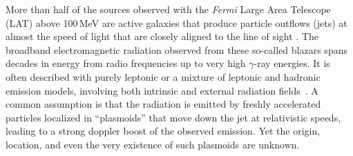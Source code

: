 \documentclass[twocolumn]{aastex62}
\newcommand{\gray}{$\gamma$-ray\xspace}
\newcommand{\Fermi}{\emph{Fermi}\xspace}
\newcommand{\FermiLAT}{\emph{Fermi}~LAT\xspace}
\begin{document}
More than half of the sources observed with the \Fermi Large Area Telescope (LAT) above 100\,MeV are active galaxies that produce particle outflows (jets) at almost the speed of light that are closely aligned to the line of sight \citep[see, e.g., the third \FermiLAT source catalog, i.e., the 3FGL;][]{3fgl}.
The broadband electromagnetic radiation observed from these so-called blazars spans decades in energy from radio frequencies up to very high \gray energies. 
It is often described with purely leptonic or a mixture of leptonic and hadronic emission models, involving both intrinsic and external radiation fields~\cite[e.g.,][and references therein]{Madejski:2016oqg}.
A common assumption is that the radiation is emitted by freshly accelerated   particles localized in ``plasmoids''  that move down the jet at relativistic speeds,
 leading to a strong doppler boost of the observed emission. 
Yet the origin, location, and even the very existence of such plasmoids are unknown.
\end{document}
